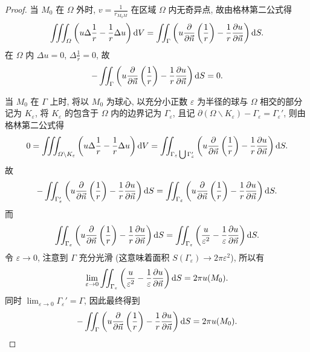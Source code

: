 \begin{proof}
  当 $M_0$ 在 $\varOmega$ 外时, $v=\frac{1}{r_{M_0M}}$ 在区域 $\varOmega$ 内无奇异点, 故由格林第二公式得
  \[\iiint_{\varOmega} \left(u\Delta\frac{1}{r}-\frac{1}{r}\Delta u\right)\mathop{}\!\mathrm{d} V
    = \iint_{\Gamma}\left(u\frac{\partial}{\partial\vec{n}}\left(\frac{1}{r}\right)
      - \frac{1}{r}\frac{\partial u}{\partial\vec{n}}\right) \mathop{}\!\mathrm{d} S.\]
  在 $\varOmega$ 内 $\Delta u=0$, $\Delta\frac{1}{r}=0$, 故
  \[-\iint_{\Gamma}\left(u\frac{\partial}{\partial\vec{n}}\left(\frac{1}{r}\right)
    - \frac{1}{r}\frac{\partial u}{\partial\vec{n}}\right)\mathop{}\!\mathrm{d} S = 0.\]

  当 $M_0$ 在 $\Gamma$ 上时, 将以 $M_0$ 为球心, 
  以充分小正数 $\varepsilon$ 为半径的球与 $\varOmega$ 相交的部分记为 $K_{\varepsilon}$,
  将 $K_{\varepsilon}$ 的包含于 $\varOmega$ 内的边界记为 $\Gamma_{\varepsilon}$,
  且记 $\partial(\varOmega\backslash K_{\varepsilon})-\Gamma_{\varepsilon}=\Gamma_{\varepsilon}'$,
  则由格林第二公式得
  \[0 = \iiint_{\varOmega\backslash K_{\varepsilon}}
    \left(u\Delta\frac{1}{r} - \frac{1}{r}\Delta u\right)\mathop{}\!\mathrm{d} V
    = \iint_{\Gamma_{\varepsilon}\bigcup\Gamma_{\varepsilon}'} \left(u\frac{\partial}{\partial\vec{n}}
      \left(\frac{1}{r}\right)-\frac{1}{r}\frac{\partial u}{\partial\vec{n}}\right) \mathop{}\!\mathrm{d} S.\]
  故
  \[-\iint_{\Gamma_{\varepsilon}'} \left(u\frac{\partial}{\partial\vec{n}}\left(\frac{1}{r}\right)
    -\frac{1}{r}\frac{\partial u}{\partial\vec{n}}\right) \mathop{}\!\mathrm{d} S
    = \iint_{\Gamma_{\varepsilon}}\left(u\frac{\partial}{\partial\vec{n}}
      \left(\frac{1}{r}\right) - \frac{1}{r}\frac{\partial u}{\partial\vec{n}}\right)\mathop{}\!\mathrm{d} S.\]
  而
  \[\iint_{\Gamma_{\varepsilon}} \left(u\frac{\partial}{\partial\vec{n}}\left(\frac{1}{r}\right)
    -\frac{1}{r}\frac{\partial u}{\partial\vec{n}}\right) \mathop{}\!\mathrm{d} S
    = \iint_{\Gamma_{\varepsilon}}\left(\frac{u}{\varepsilon^2}
      - \frac{1}{\varepsilon}\frac{\partial u}{\partial\vec{n}}\right) \mathop{}\!\mathrm{d} S.\]
  令 $\varepsilon\to 0$, 注意到 $\Gamma$ 充分光滑
  (这意味着面积 $S(\Gamma_{\varepsilon})\to 2\pi\varepsilon^2$), 所以有
  \[\lim_{\varepsilon\to 0} \iint_{\Gamma_{\varepsilon}}
    \left(\frac{u}{\varepsilon^2}-\frac{1}{\varepsilon}\frac{\partial u}{\partial\vec{n}}\right)\mathop{}\!\mathrm{d} S
    = 2\pi u(M_0).\]
  同时 $\lim_{\varepsilon\to0}\Gamma_{\varepsilon}'=\Gamma$, 因此最终得到
  \[-\iint_{\Gamma} \left(u\frac{\partial}{\partial\vec{n}}\left(\frac{1}{r}\right)-\frac{1}{r}
    \frac{\partial u}{\partial\vec{n}}\right)\mathop{}\!\mathrm{d} S = 2\pi u(M_0). \qedhere\]
\end{proof}


